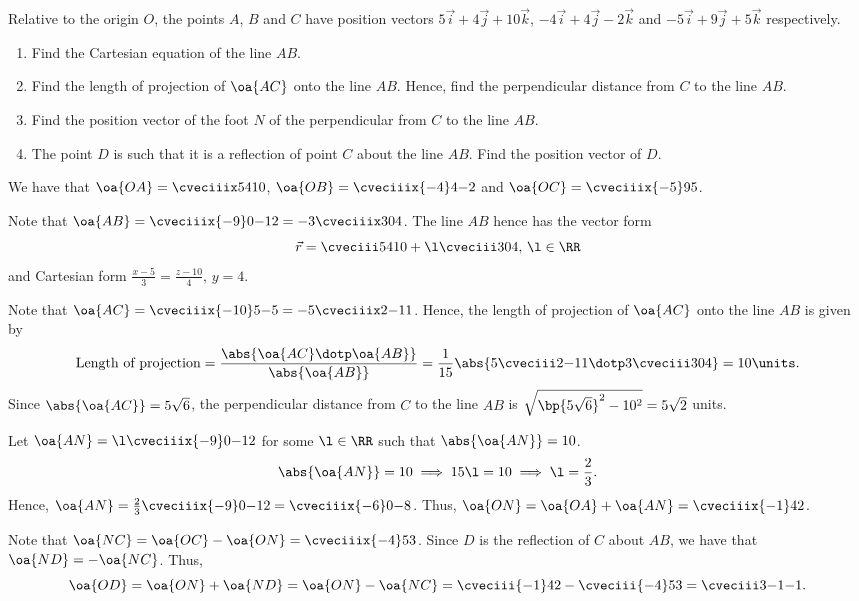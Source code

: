 \begin{problem}
    Relative to the origin $O$, the points $A$, $B$ and $C$ have position vectors $5\vec i + 4\vec j + 10\vec k$, $-4\vec i + 4\vec j - 2\vec k$ and $-5\vec i + 9\vec j + 5\vec k$ respectively.

    \begin{enumerate}
        \item Find the Cartesian equation of the line $AB$.
        \item Find the length of projection of $\oa{AC}$ onto the line $AB$. Hence, find the perpendicular distance from $C$ to the line $AB$.
        \item Find the position vector of the foot $N$ of the perpendicular from $C$ to the line $AB$.
        \item The point $D$ is such that it is a reflection of point $C$ about the line $AB$. Find the position vector of $D$.
    \end{enumerate}
\end{problem}
\begin{solution}
    We have that $\oa{OA} = \cveciiix54{10}$, $\oa{OB} = \cveciiix{-4}4{-2}$ and $\oa{OC} = \cveciiix{-5}95$.

    \begin{ppart}
        Note that $\oa{AB} = \cveciiix{-9}0{-12} = -3\cveciiix304$. The line $AB$ hence has the vector form \[\vec r = \cveciii54{10} + \l\cveciii304, \, \l \in \RR\] and Cartesian form $\frac{x-5}{3} = \frac{z-10}4,\,y=4$.
    \end{ppart}
    \begin{ppart}
        Note that $\oa{AC} = \cveciiix{-10}5{-5} = -5\cveciiix2{-1}1$. Hence, the length of projection of $\oa{AC}$ onto the line $AB$ is given by \[\text{Length of projection} = \frac{\abs{\oa{AC} \dotp \oa{AB}}}{\abs{\oa{AB}}} = \frac1{15} \abs{5\cveciii2{-1}1 \dotp 3\cveciii304} = 10 \units.\] Since $\abs{\oa{AC}} = 5\sqrt6$, the perpendicular distance from $C$ to the line $AB$ is $\sqrt{\bp{5\sqrt6}^2 - 10^2} = 5\sqrt{2}$ units.
    \end{ppart}
    \begin{ppart}
        Let $\oa{AN} = \l \cveciiix{-9}0{-12}$ for some $\l \in \RR$ such that $\abs{\oa{AN}} = 10$. \[\abs{\oa{AN}} = 10 \implies 15\l = 10 \implies \l = \frac23.\] Hence, $\oa{AN} = \frac23 \cveciiix{-9}0{-12} = \cveciiix{-6}0{-8}$. Thus, $\oa{ON} = \oa{OA} + \oa{AN} = \cveciiix{-1}42$.
    \end{ppart}
    \begin{ppart}
        Note that $\oa{NC} = \oa{OC} - \oa{ON} = \cveciiix{-4}53$. Since $D$ is the reflection of $C$ about $AB$, we have that $\oa{ND} = -\oa{NC}$. Thus, \[\oa{OD} = \oa{ON} + \oa{ND} = \oa{ON} - \oa{NC} = \cveciii{-1}42 - \cveciii{-4}53 = \cveciii3{-1}{-1}.\]
    \end{ppart}
\end{solution}

